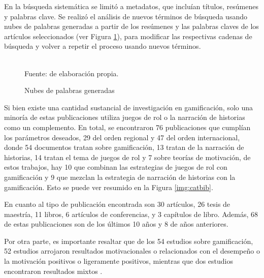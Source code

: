 En la búsqueda sistemática se limitó a metadatos, que incluían títulos, resúmenes y palabras clave. Se realizó 
el análisis de nuevos términos de búsqueda usando nubes de palabras generadas a partir de los resúmenes y las 
palabras claves de los artículos seleccionados (ver Figura \ref{img:nube}), para modificar las respectivas 
cadenas de búsqueda y volver a repetir el proceso usando nuevos términos. 

\begin{figure}[ht]
  \caption{Nubes de palabras generadas}
  \label{img:nube}
  \centering
  \hfill
  \\
  {\footnotesize Fuente: de elaboración propia.}
\end{figure}

Si bien existe una cantidad sustancial de investigación en gamificación, solo una minoría de estas 
publicaciones utiliza juegos de rol o la narración de historias como un complemento. En total, se encontraron
76 publicaciones que cumplían los parámetros deseados, 29 del orden regional y 47 del orden internacional, 
donde 54 documentos tratan sobre gamificación, 13 tratan de la narración de historias, 14 tratan el tema de 
juegos de rol y 7 sobre teorías de motivación, de estos trabajos, hay 10 que combinan las estrategias de 
juegos de rol con gamificación y 9 que mezclan la estrategia de narración de historias con la gamificación. 
Esto se puede ver resumido en la Figura \ref{img:catbib}.

En cuanto al tipo de publicación encontrada son 30 artículos, 26 tesis de maestría, 11 libros, 6 artículos de 
conferencias, y 3 capítulos de libro. Además, 68 de estas publicaciones son de los últimos 10 años y 8 de años 
anteriores.

Por otra parte, es importante resaltar que de los 54 estudios sobre gamificación, 52 estudios arrojaron 
resultados motivacionales o relacionados con el desempeño o la motivación positivos o ligeramente positivos, 
mientras que dos estudios encontraron resultados mixtos \cite{DING20191, PRESTOPNIK2015492}.

